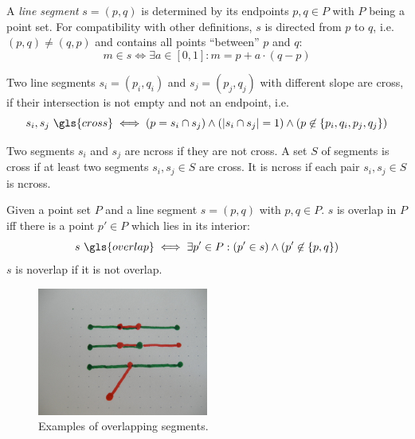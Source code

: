 
\begin{definition}
  A \emph{line segment} \(s=(p,q)\) is determined by its endpoints
  \(p,q\in P\) with \(P\) being a point set. For compatibility
  with other definitions, \(s\) is directed from \(p\) to \(q\), i.e.
  \((p,q)\not=(q,p)\) and contains all points ``between'' \(p\) and
  \(q\):
  \[ m \in s \iff \exists a\in [0,1] : m = p + a \cdot (q-p) \]
\end{definition}


\begin{definition}[Crossing]\label{def:crossing}
  Two line segments \(s_i=(p_i,q_i)\) and \(s_j=(p_j,q_j)\) with 
  different slope are \gls{cross}, if their intersection is not empty
  and not an endpoint, i.e.
  \[
    s_i, s_j~\gls{cross}
    \iff
    (p = s_i\cap s_j) \land
    (|s_i\cap s_j| = 1) \land
    (p \not\in \{p_i,q_i,p_j,q_j\})
  \]

  Two segments \(s_i\) and \(s_j\) are \gls{ncross} if they are
  not \gls{cross}. A set \(S\) of segments is \gls{cross} if at least
  two segments \(s_i, s_j \in S\) are \gls{cross}. It is \gls{ncross}
  if each pair \(s_i, s_j \in S\) is \gls{ncross}.
\end{definition}


\begin{definition}
  \label{def:overlapping_segments}
  Given a point set \(P\) and a line segment \(s = (p,q)\) with
  \(p,q \in P\). \(s\) is \gls{overlap} in \(P\) iff there is a point
  \(p' \in P\) which lies in its interior:
  \[
    s~\gls{overlap}
    \iff  \exists p' \in P : (p' \in s) \land (p' \not\in \{p,q\})
  \]
  \(s\) is \gls{noverlap} if it is not \gls{overlap}.
\end{definition}

\begin{figure}[ht]
  \centering
  \includegraphics[width=0.5\textwidth]{img/example_overlapping.jpg}
  \caption{Examples of overlapping segments.}
\end{figure}

